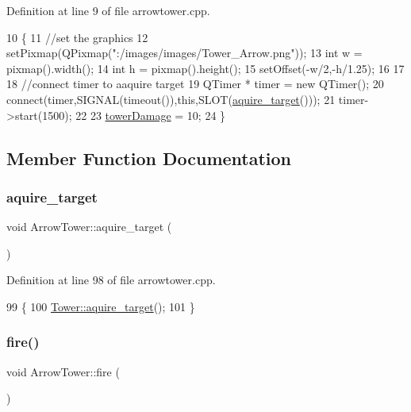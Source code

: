 Definition at line 9 of file arrowtower.\+cpp.


\begin{DoxyCode}
10 \{
11     \textcolor{comment}{//set the graphics}
12     setPixmap(QPixmap(\textcolor{stringliteral}{":/images/images/Tower\_Arrow.png"}));
13     \textcolor{keywordtype}{int} w = pixmap().width();
14     \textcolor{keywordtype}{int} h = pixmap().height();
15     setOffset(-w/2,-h/1.25);
16 
17 
18     \textcolor{comment}{//connect timer to aaquire target}
19     QTimer * timer = \textcolor{keyword}{new} QTimer();
20     connect(timer,SIGNAL(timeout()),\textcolor{keyword}{this},SLOT(\hyperlink{class_arrow_tower_a0f2d63e9e3e3a8a1e6914711f3319df6}{aquire\_target}()));
21     timer->start(1500);
22 
23     \hyperlink{class_arrow_tower_a3623752851bb010bb650ca63ed9dd26c}{towerDamage} = 10;
24 \}
\end{DoxyCode}


\subsection{Member Function Documentation}
\mbox{\label{class_arrow_tower_a0f2d63e9e3e3a8a1e6914711f3319df6}} 
\subsubsection{\texorpdfstring{aquire\+\_\+target}{aquire\_target}}
{\footnotesize\ttfamily void Arrow\+Tower\+::aquire\+\_\+target (\begin{DoxyParamCaption}{ }\end{DoxyParamCaption})\hspace{0.3cm}{\ttfamily [slot]}}



Definition at line 98 of file arrowtower.\+cpp.


\begin{DoxyCode}
99 \{
100     \hyperlink{class_tower_a6e0df1e43e746622967918aaf6f42dce}{Tower::aquire\_target}();
101 \}
\end{DoxyCode}
\mbox{\label{class_arrow_tower_ab4ed87128b5037a98640ab05e8721d88}} 
\subsubsection{\texorpdfstring{fire()}{fire()}}
{\footnotesize\ttfamily void Arrow\+Tower\+::fire (\begin{DoxyParamCaption}{ }\end{DoxyParamCaption})\hspace{0.3cm}{\ttfamily [virtual]}}



